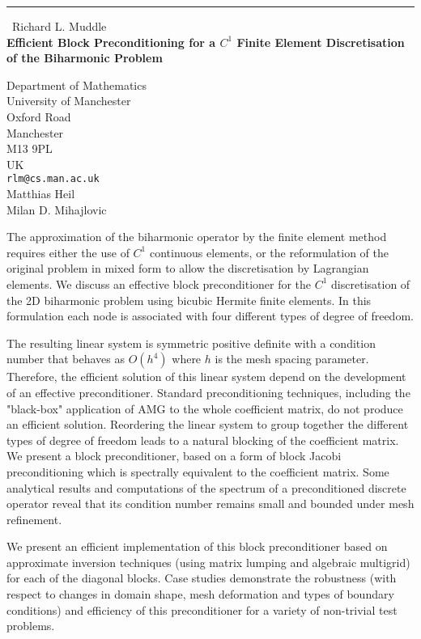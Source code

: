 \documentclass{report}
\begin{document}
\begin{center}
\rule{6in}{1pt} \
{\large Richard L. Muddle \\
{\bf Efficient Block Preconditioning for a $C^1$ Finite Element Discretisation of the Biharmonic Problem}}

Department of Mathematics \\ University of Manchester \\ Oxford Road \\ Manchester \\ M13 9PL \\ UK
\\
{\tt rlm@cs.man.ac.uk}\\
Matthias Heil\\
Milan D. Mihajlovic\end{center}

The approximation of the biharmonic operator by the finite element method
requires either the use of $C^1$ continuous elements, or the
reformulation of the original problem in mixed form to allow the
discretisation by Lagrangian elements. We discuss an effective block
preconditioner for the $C^1$ discretisation of the 2D biharmonic problem
using bicubic Hermite finite elements. In this formulation each node is
associated with four different types of degree of freedom.

The resulting linear system is symmetric positive definite with a
condition number that behaves as $O(h^4)$ where $h$ is the mesh spacing
parameter. Therefore, the efficient solution of this linear system depend
on the development of an effective preconditioner. Standard
preconditioning techniques, including the "black-box" application of AMG
to the whole coefficient matrix, do not produce an efficient solution.
Reordering the linear system to group together the different types of
degree of freedom leads to a natural blocking of the coefficient matrix.
We present a block preconditioner, based on a form of block Jacobi
preconditioning which is spectrally equivalent to the coefficient matrix.
Some analytical results and computations of the spectrum of a
preconditioned discrete operator reveal that its condition number remains
small and bounded under mesh refinement.

We present an efficient implementation of this block preconditioner based
on approximate inversion techniques (using matrix lumping and algebraic
multigrid) for each of the diagonal blocks. Case studies demonstrate the
robustness (with respect to changes in domain shape, mesh deformation and
types of boundary conditions) and efficiency of this preconditioner for a
variety of non-trivial test problems.
\end{document}

